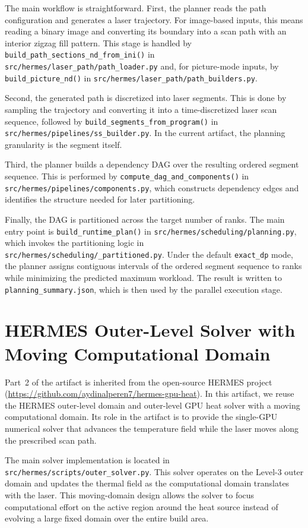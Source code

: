 \documentclass[11pt]{article}
\begin{document}
The main workflow is straightforward. First, the planner reads the path
configuration and generates a laser trajectory. For image-based inputs, this
means reading a binary image and converting its boundary into a scan path with
an interior zigzag fill pattern. This stage is handled by
\texttt{build\_path\_sections\_nd\_from\_ini()} in
\texttt{src/hermes/laser\_path/path\_loader.py} and, for picture-mode inputs,
by \texttt{build\_picture\_nd()} in
\texttt{src/hermes/laser\_path/path\_builders.py}.

Second, the generated path is discretized into laser segments. This is done by
sampling the trajectory and converting it into a time-discretized laser scan
sequence, followed by \texttt{build\_segments\_from\_program()} in
\texttt{src/hermes/pipelines/ss\_builder.py}. In the current artifact, the
planning granularity is the segment itself.

Third, the planner builds a dependency DAG over the resulting ordered segment
sequence. This is performed by \texttt{compute\_dag\_and\_components()} in
\texttt{src/hermes/pipelines/components.py}, which constructs dependency edges
and identifies the structure needed for later partitioning.

Finally, the DAG is partitioned across the target number of ranks. The main
entry point is \texttt{build\_runtime\_plan()} in
\texttt{src/hermes/scheduling/planning.py}, which invokes the partitioning
logic in \texttt{src/hermes/scheduling/\_partitioned.py}. Under the default
\texttt{exact\_dp} mode, the planner assigns contiguous intervals of the ordered
segment sequence to ranks while minimizing the predicted maximum workload. The
result is written to \texttt{planning\_summary.json}, which is then used by the
parallel execution stage.

\section{HERMES Outer-Level Solver with Moving Computational Domain}

Part~2 of the artifact is inherited from the open-source HERMES project
(\url{https://github.com/aydinalperen7/hermes-gpu-heat}). In this artifact,
we reuse the HERMES outer-level domain and outer-level GPU heat solver with a
moving computational domain. Its role in the artifact is to provide the
single-GPU numerical solver that advances the temperature field while the laser
moves along the prescribed scan path.

The main solver implementation is located in
\texttt{src/hermes/scripts/outer\_solver.py}. This solver operates on the
Level-3 outer domain and updates the thermal field as the computational domain
translates with the laser. This moving-domain design allows the solver to focus
computational effort on the active region around the heat source instead of
evolving a large fixed domain over the entire build area.
\end{document}
